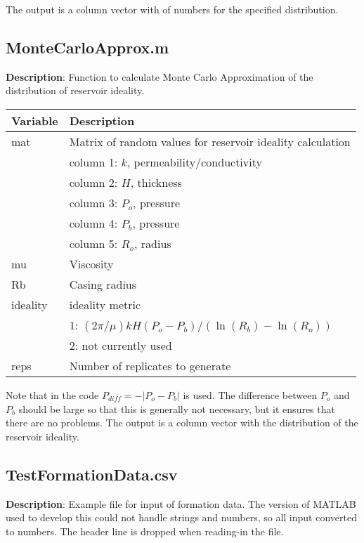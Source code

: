 \documentclass[12pt,a4paper]{article}
\begin{document}
The output is a column vector with of numbers for the specified distribution.

\subsection{\textsf{MonteCarloApprox.m}}

\textbf{Description}: Function to calculate Monte Carlo Approximation of the distribution of reservoir ideality.

\begin{table}[H]
\begin{tabular} {p{2cm} p{11cm}}
\hline
\textbf{Variable} & \textbf{Description}\\
\hline
\textsf{mat} 			 & Matrix of random values for reservoir ideality calculation\\
 & column 1: $k$, permeability/conductivity\\
 & column 2: $H$, thickness\\
 & column 3: $P_o$, pressure\\
 & column 4: $P_b$, pressure\\
 & column 5: $R_o$, radius\\
\textsf{mu} & Viscosity\\
\textsf{Rb} & Casing radius\\
\textsf{ideality} & ideality metric\\
 & 1: $(2\pi/\mu)kH(P_o - P_b)/(\ln(R_b) - \ln(R_o))$\\
 & 2: not currently used\\
\textsf{reps} & Number of replicates to generate\\
\hline
\end{tabular} 
\end{table}

Note that in the code $P_{diff} = -|P_o - P_b|$ is used. The difference between $P_o$ and $P_b$ should be large so that this is generally not necessary, but it ensures that there are no problems. The output is a column vector with the distribution of the reservoir ideality.

\subsection{\textsf{TestFormationData.csv}}

\textbf{Description}: Example file for input of formation data. The version of MATLAB used to develop this could not handle strings and numbers, so all input converted to numbers. The header line is dropped when reading-in the file.
\end{document}
